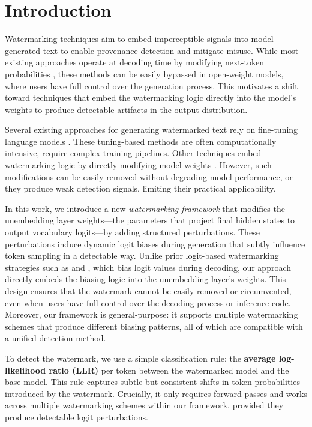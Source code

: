 \section{Introduction}

Watermarking techniques aim to embed imperceptible signals into model-generated text to enable provenance detection and mitigate misuse. While most existing approaches operate at decoding time by modifying next-token probabilities \citep{kirchenbauer2023watermark, aaronson2023reform, kuditipudi2023robust, liu2024adaptive}, these methods can be easily bypassed in open-weight models, where users have full control over the generation process. This motivates a shift toward techniques that embed the watermarking logic directly into the model's weights to produce detectable artifacts in the output distribution.

Several existing approaches for generating watermarked text rely on fine-tuning language models \cite{gu2023learnability,xu2024learningwatermarkllmgeneratedtext,elhassan2025can}. These tuning-based methods are often computationally intensive, require complex training pipelines. Other techniques embed watermarking logic by directly modifying model weights \cite{christ2024provably, block2025gaussmark}. However, such modifications can be easily removed without degrading model performance, or they produce weak detection signals, limiting their practical applicability.

In this work, we introduce a new \emph{watermarking framework} that modifies the unembedding layer weights—the parameters that project final hidden states to output vocabulary logits—by adding structured perturbations. These perturbations induce dynamic logit biases during generation that subtly influence token sampling in a detectable way. Unlike prior logit-based watermarking strategies such as \citet{kirchenbauer2023watermark} and \citet{liu2024adaptive}, which bias logit values during decoding, our approach directly embeds the biasing logic into the unembedding layer's weights. This design ensures that the watermark cannot be easily removed or circumvented, even when users have full control over the decoding process or inference code. Moreover, our framework is general-purpose: it supports multiple watermarking schemes that produce different biasing patterns, all of which are compatible with a unified detection method.

To detect the watermark, we use a simple classification rule: the \textbf{average log-likelihood ratio (LLR)} per token between the watermarked model and the base model. This rule captures subtle but consistent shifts in token probabilities introduced by the watermark. Crucially, it only requires forward passes and works across multiple watermarking schemes within our framework, provided they produce detectable logit perturbations.

